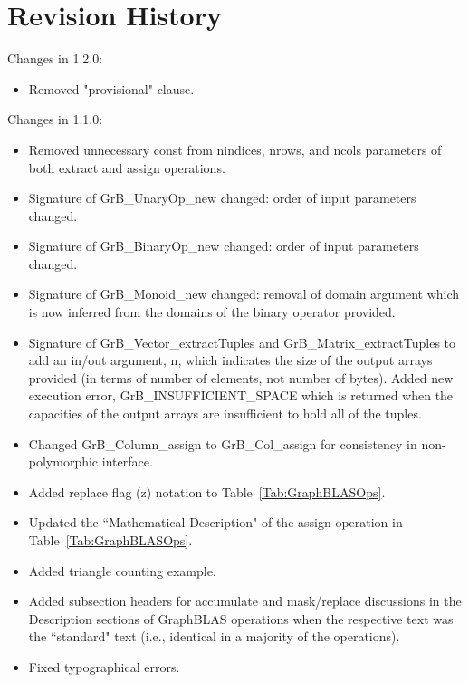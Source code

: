 \chapter{Revision History}
\label{Chp:RevHistory}

Changes in 1.2.0:
\begin{itemize}
\item Removed "provisional" clause.
\end{itemize}


Changes in 1.1.0:
\begin{itemize}
\item Removed unnecessary {\sf const} from {\sf nindices}, {\sf nrows}, and {\sf ncols} parameters of both {\sf extract} and {\sf assign} operations.
\item Signature of {\sf GrB\_UnaryOp\_new} changed: order of input parameters changed.
\item Signature of {\sf GrB\_BinaryOp\_new} changed: order of input parameters changed.
\item Signature of {\sf GrB\_Monoid\_new} changed: removal of domain argument which is now inferred from the domains of the binary operator provided.
\item Signature of {\sf GrB\_Vector\_extractTuples} and {\sf GrB\_Matrix\_extractTuples} to add an in/out argument, {\sf n}, which indicates the size of the output arrays provided (in terms of number of elements, not number of bytes).  Added new execution error, {\sf GrB\_INSUFFICIENT\_SPACE} which is returned when the capacities of the output arrays are insufficient to hold all of the tuples.
\item Changed {\sf GrB\_Column\_assign} to {\sf GrB\_Col\_assign} for consistency in non-polymorphic interface.
\item Added replace flag (z) notation to Table~\ref{Tab:GraphBLASOps}.
\item Updated the ``Mathematical Description" of the assign operation in Table~\ref{Tab:GraphBLASOps}.
\item Added triangle counting example.
\item Added subsection headers for accumulate and mask/replace discussions in the Description sections of GraphBLAS operations when the respective text was the ``standard" text (i.e., identical in a majority of the operations).
\item Fixed typographical errors.
\end{itemize}  

